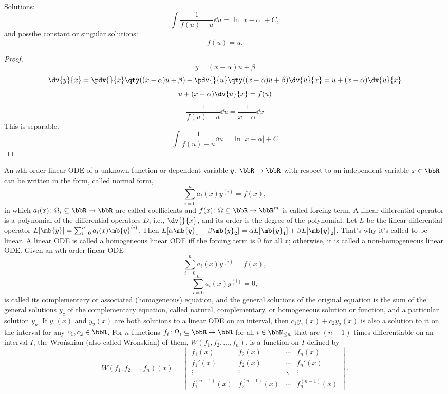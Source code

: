 \documentclass[a4paper,12pt]{report}
\begin{document}
Solutions:
\[\int\frac{1}{f(u)-u}\dd{u}=\ln|x-\alpha|+C,\]
and possibe constant or singular solutions:
\[f(u)=u.\]
\begin{proof}
\[y=(x-\alpha)u+\beta\]
\[\dv{y}{x}=\pdv{}{x}\qty((x-\alpha)u+\beta)+\pdv{}{u}\qty((x-\alpha)u+\beta)\dv{u}{x}=u+(x-\alpha)\dv{u}{x}\]
\[u+(x-\alpha)\dv{u}{x}=f(u)\]
\[\frac{1}{f(u)-u}\dd{u}=\frac{1}{x-\alpha}\dd{x}\]
This is separable.
\[\int\frac{1}{f(u)-u}\dd{u}=\ln|x-\alpha|+C\]
\end{proof}
An $n$th-order linear ODE of a unknown function or dependent variable $y\colon\bbR\to\bbR$ with respect to an independent variable $x\in\bbR$ can be written in the form, called normal form,
\[\sum_{i=0}^na_i(x)y^{(i)}=f(x),\]
in which $a_i(x)\colon\Omega_i\subseteq\bbR\to\bbR$ are called coefficients and $f(x)\colon\Omega\subseteq\bbR\to\bbR^m$ is called forcing term.
A linear differential operator is a polynomial of the differential operators $D$, i.e., $\dv{}{x}$, and its order is the degree of the polynomial.
Let $L$ be the linear differential operator $L[\mb{y}]=\sum_{i=0}^na_i(x)\mb{y}^{(i)}$. Then $L[\alpha\mb{y}_1+\beta\mb{y}_2]=\alpha L[\mb{y}_1]+\beta L[\mb{y}_2]$. That's why it's called to be linear.
A linear ODE is called a homogeneous linear ODE iff the forcing term is 0 for all $x$; otherwise, it is called a non-homogeneous linear ODE.
Given an $n$th-order linear ODE
\[\sum_{i=0}^na_i(x)y^{(i)}=f(x),\]
\[\sum_{i=0}^na_i(x)y^{(i)}=0,\]
is called its complementary or associated (homogeneous) equation, and the general solutions of the original equation is the sum of the general solutions $y_c$ of the complementary equation, called natural, complementary, or homogeneous solution or function, and a particular solution $y_p$.
If $y_1(x)$ and $y_2(x)$ are both solutions to a linear ODE on an interval, then $c_1y_1(x)+c_2y_2(x)$ is also a solution to it on the interval for any $c_1,c_2\in\bbR$.
For $n$ functions $f_i\colon\Omega_i\subseteq\bbR\to\bbR$ for all $i\in\bbN_{\le n}$ that are $(n-1)$ times differentiable on an interval $I$, the Wrońskian (also called Wronskian) of them, $W(f_1,f_2,\ldots,f_n)$, is a function on $I$ defined by
\[W(f_1,f_2,\ldots,f_n)(x)=\begin{vmatrix}
f_1(x) & f_2(x) & \cdots & f_n(x) \\
f_1'(x) & f_2(x) & \cdots & f_n'(x) \\
\vdots & \vdots & \ddots & \vdots \\
f_1^{(n-1)}(x) & f_2^{(n-1)}(x) & \cdots & f_n^{(n-1)}(x)
\end{vmatrix}.\]
\end{document}
